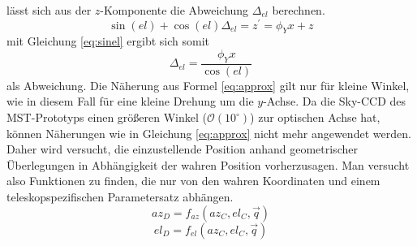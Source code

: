 lässt sich aus der $z$-Komponente die Abweichung $\Delta_{el}$ berechnen.
\begin{equation}
\sin(el)+\cos(el)\Delta_{el}=z^{\prime}=\phi_Yx+z
\end{equation}
mit Gleichung \ref{eq:sinel} ergibt sich somit 
\begin{equation}
\Delta_{el}=\frac{\phi_Yx}{\cos(el)}
\end{equation}
als Abweichung. Die Näherung aus Formel \ref{eq:approx} gilt nur für kleine Winkel, wie in diesem Fall für eine kleine Drehung um die $y$-Achse.
Da die Sky-CCD des MST-Prototyps einen größeren Winkel ($\mathcal{O}\left(10^{\circ}\right)$) zur optischen Achse hat, können Näherungen wie in Gleichung \ref{eq:approx} nicht mehr angewendet werden. Daher wird versucht, die einzustellende Position anhand geometrischer Überlegungen in Abhängigkeit der wahren Position vorherzusagen. Man versucht also Funktionen zu finden, die nur von den wahren Koordinaten und einem teleskopspezifischen Parametersatz abhängen.
\begin{equation} 
az_D=f_{az}(az_C,el_C,\vec{q})
\end{equation}
\begin{equation}
el_D=f_{el}(az_C,el_C,\vec{q})
\label{eq:pointingprinciple}
\end{equation}

